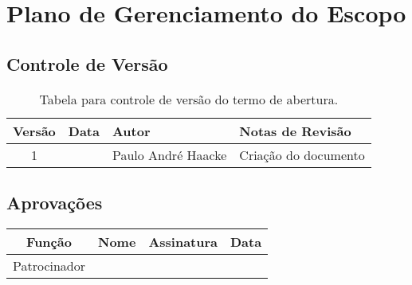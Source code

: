 \section{Plano de Gerenciamento do Escopo}

\subsection{Controle de Versão}

\begin{table}[H]
	\begin{tabularx}{.9\textwidth}{| c | c | X | X |}
		\hline
		\textbf{Versão} & \textbf{Data} & \textbf{Autor}      & \textbf{Notas de Revisão} \\
		\hline
		1                &               & Paulo André Haacke & Criação do documento     \\
		\hline
	\end{tabularx}
	\centering
	\caption{Tabela para controle de versão do termo de abertura.}
\end{table}

\subsection{Aprovações}

\begin{table}[H]
	\begin{tabularx}{\textwidth}{| c | c | X | c |}
		\hline
		\textbf{Função} & \textbf{Nome}       & \textbf{Assinatura}      & \textbf{Data} \\
		\hline
		Patrocinador      & \projectSponsorName & \projectSponsorSignature &               \\
		\hline
	\end{tabularx}
	\centering
\end{table}

